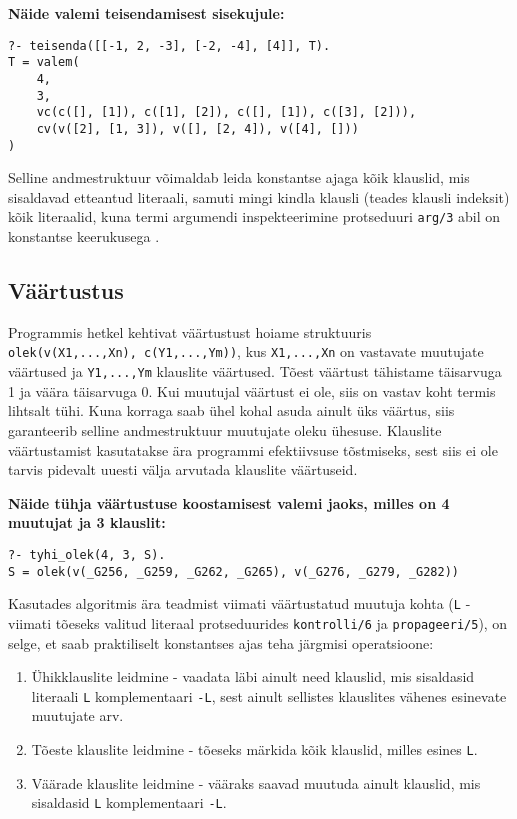 \textbf{Näide valemi teisendamisest sisekujule:}

\begin{verbatim}
?- teisenda([[-1, 2, -3], [-2, -4], [4]], T).
T = valem(
    4,
    3,
    vc(c([], [1]), c([1], [2]), c([], [1]), c([3], [2])),
    cv(v([2], [1, 3]), v([], [2, 4]), v([4], []))
)
\end{verbatim}

Selline andmestruktuur võimaldab leida konstantse ajaga kõik klauslid, mis
sisaldavad etteantud literaali, samuti mingi kindla klausli (teades klausli
indeksit) kõik literaalid, kuna termi argumendi inspekteerimine protseduuri
\texttt{arg/3} abil on konstantse keerukusega \cite{swi}.

\subsection{Väärtustus}

Programmis hetkel kehtivat väärtustust hoiame struktuuris \\
{\tt olek(v(X1,...,Xn), c(Y1,...,Ym))}, kus
{\tt X1,...,Xn} on vastavate muutujate väärtused ja {\tt Y1,...,Ym} klauslite
väärtused. Tõest väärtust tähistame täisarvuga 1 ja väära täisarvuga 0. Kui
muutujal väärtust ei ole, siis on vastav koht termis lihtsalt tühi. Kuna
korraga saab ühel kohal asuda ainult üks väärtus, siis garanteerib selline
andmestruktuur muutujate oleku ühesuse. Klauslite väärtustamist kasutatakse ära
programmi efektiivsuse tõstmiseks, sest siis ei ole tarvis pidevalt uuesti
välja arvutada klauslite väärtuseid.

\textbf{Näide tühja väärtustuse koostamisest valemi jaoks, milles on 4 muutujat
ja 3 klauslit:}

\begin{verbatim}
?- tyhi_olek(4, 3, S).
S = olek(v(_G256, _G259, _G262, _G265), v(_G276, _G279, _G282))
\end{verbatim}

Kasutades algoritmis ära teadmist viimati väärtustatud muutuja kohta
(\texttt{L} - viimati tõeseks valitud literaal protseduurides
\texttt{kontrolli/6} ja \texttt{propageeri/5}), on selge, et saab praktiliselt
konstantses ajas teha järgmisi operatsioone:

\begin{enumerate}
  \item Ühikklauslite leidmine - vaadata läbi ainult need klauslid, mis
  sisaldasid literaali \texttt{L} komplementaari \texttt{-L}, sest ainult
  sellistes klauslites vähenes esinevate muutujate arv.
  \item Tõeste klauslite leidmine - tõeseks märkida kõik
  klauslid, milles esines \texttt{L}.
  \item Väärade klauslite leidmine - vääraks saavad muutuda ainult klauslid,
  mis sisaldasid \texttt{L} komplementaari \texttt{-L}.
\end{enumerate}
